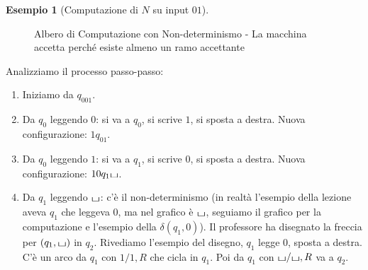 \documentclass[a4paper]{article}
\theoremstyle{definition} %
\newtheorem{example}{Esempio}
\newcommand{\blankS}{\ensuremath{\raisebox{-0.15ex}{\scalebox{1.3}[0.7]{$\sqcup$}}}}
\begin{document}
\begin{example}[Computazione di $N$ su input $01$]
\begin{figure}[h!]
    \caption{Albero di Computazione con Non-determinismo - La macchina accetta perché esiste almeno un ramo accettante}
\end{figure}
Analizziamo il processo passo-passo:
\begin{enumerate}
    \item Iniziamo da $q_001$.
    \item Da $q_0$ leggendo $0$: si va a $q_0$, si scrive $1$, si sposta a destra. Nuova configurazione: $1q_01$.
    \item Da $q_0$ leggendo $1$: si va a $q_1$, si scrive $0$, si sposta a destra. Nuova configurazione: $10q_1\blankS$.
    \item Da $q_1$ leggendo $\blankS$: c'è il non-determinismo (in realtà l'esempio della lezione aveva $q_1$ che leggeva $0$, ma nel grafico è $\blankS$, seguiamo il grafico per la computazione e l'esempio della $\delta(q_1,0)$). Il professore ha disegnato la freccia per $(q_1, \blankS)$ in $q_2$. Rivediamo l'esempio del disegno, $q_1$ legge $0$, sposta a destra. C'è un arco da $q_1$ con $1/1,R$ che cicla in $q_1$. Poi da $q_1$ con $\blankS/\blankS,R$ va a $q_2$.
    

\end{enumerate}
\end{example}
\end{document}
